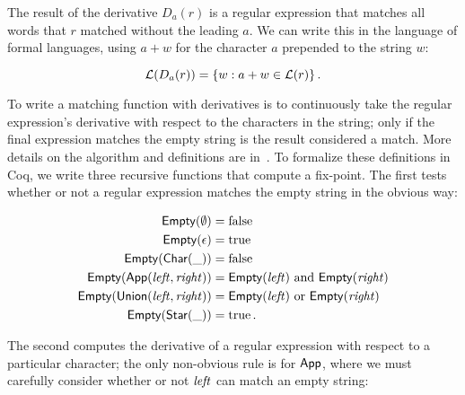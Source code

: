 The result of the derivative \(D_a(r)\) is a regular expression that matches all
words that \(r\) matched without the leading \(a\). We can write this in the
language of formal languages, using \(a + w\) for the character \(a\) prepended
to the string \(w\):

\begin{equation*}
    \mathcal{L}(D_a(r)) = \left\{ w : a + w \in \mathcal{L}(r)\right\}.
\end{equation*}

To write a matching function with derivatives is to continuously take the
regular expression's derivative with respect to the characters in the string;
only if the final expression matches the empty string is the result considered a
match. More details on the algorithm and definitions are
in~\cite{Might_Yacc,Might_desugar,Might_deriv}. To formalize these definitions
in Coq, we write three recursive functions that compute a fix-point. The first
tests whether or not a regular expression matches the empty string in the
obvious way:

\begin{align*}
    \mathsf{Empty}(\emptyset) &= \operatorname{false} \\
    \mathsf{Empty}(\epsilon) &= \operatorname{true} \\
    \mathsf{Empty}(\mathsf{Char}(\_)) &= \operatorname{false} \\
    \mathsf{Empty}(\mathsf{App}(\mathit{left}, \mathit{right})) &=
        \mathsf{Empty}(\mathit{left}) \text{ and } \mathsf{Empty}(\mathit{right}) \\
    \mathsf{Empty}(\mathsf{Union}(\mathit{left}, \mathit{right})) &=
        \mathsf{Empty}(\mathit{left}) \text{ or } \mathsf{Empty}(\mathit{right}) \\
    \mathsf{Empty}(\mathsf{Star}(\_)) &= \operatorname{true}.
\end{align*}

The second computes the derivative of a regular expression with respect to a
particular character; the only non-obvious rule is for \(\mathsf{App}\), where we
must carefully consider whether or not \(\mathit{left}\) can match an empty string:

